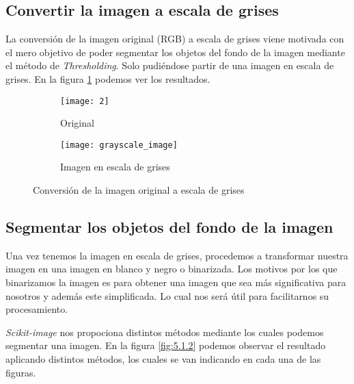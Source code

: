 \subsection{Convertir la imagen a escala de grises}

La conversión de la imagen original (RGB) a escala de grises viene motivada con el mero objetivo de poder segmentar los objetos del fondo de la imagen mediante el método de \textit{Thresholding}. Solo pudiéndose partir de una imagen en escala de grises. En la figura \ref{fig:5.1.1} podemos ver los resultados.

\begin{figure}
	\centering
	\begin{subfigure}[b]{0.45\textwidth}
        \texttt{[image: 2]}
        \caption{Original}
    \end{subfigure}
    \begin{subfigure}[b]{0.45\textwidth}
        \texttt{[image: grayscale\_image]}
        \caption{Imagen en escala de grises}
    \end{subfigure}
    \caption{Conversión de la imagen original a escala de grises}
	\label{fig:5.1.1}
\end{figure}

\subsection{Segmentar los objetos del fondo de la imagen}

Una vez tenemos la imagen en escala de grises, procedemos a transformar nuestra imagen en una imagen en blanco y negro o binarizada. Los motivos por los que binarizamos la imagen es para obtener una imagen que sea más significativa para nosotros y además este simplificada. Lo cual nos será útil para facilitarnos su procesamiento.

\textit{Scikit-image} nos propociona distintos métodos mediante los cuales podemos segmentar una imagen. En la figura \ref{fig:5.1.2} podemos observar el resultado aplicando distintos métodos, los cuales se van indicando en cada una de las figuras.

